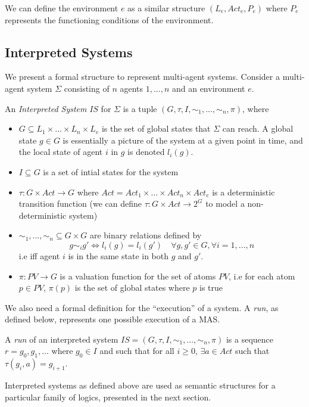\documentclass[11pt]{report}
\newenvironment{definition}[1][Definition]{\begin{trivlist}
\item[\hskip \labelsep {\bfseries #1}]}{\end{trivlist}}
\begin{document}
We can define the environment $e$ as a similar structure $(L_e, Act_e, P_e)$ where $P_e$ represents the functioning conditions of the environment. 

\subsection{Interpreted Systems}
\label{IS}
We present a formal structure to represent multi-agent systems. Consider a multi-agent system $\Sigma$ consisting of $n$ agents $1, ..., n$ and an environment $e$.
\begin{definition}
An \textit{Interpreted System} $IS$ for $\Sigma$ is a tuple $(G, \tau, I, \sim_1, ..., \sim_n, \pi)$, where
\begin{itemize}
\item $G \subseteq L_1 \times ... \times L_n \times L_e$ is the set of global states that $\Sigma$ can reach. A global state $g \in G$ is essentially a picture of the system at a given point in time, and the local state of agent $i$ in $g$ is denoted $l_i(g)$.
\item $I \subseteq G$ is a set of intial states for the system
\item $\tau : G \times Act \rightarrow G $ where $Act = Act_1 \times ... \times Act_n \times Act_e$ is a deterministic transition function (we can define $\tau : G \times Act \rightarrow 2^G$ to model a non-deterministic system)
\item $\sim_1, ..., \sim_n \subseteq G \times G$  are binary relations defined by $$g \sim_i g' \Leftrightarrow l_i(g) = l_i(g') \quad \forall g, g' \in G, \forall i = 1, ..., n$$
i.e iff agent $i$ is in the same state in both $g$ and $g'$. 
\item $\pi : PV \rightarrow G$ is a valuation function for the set of atoms $PV$, i.e for each atom $p \in PV$, $\pi(p)$ is the set of global states where $p$ is true
\end{itemize}
\end{definition}
We also need a formal definition for the ``execution'' of a system. A \emph{run}, as defined below, represents one possible execution of a MAS. 
\begin{definition} 
A \emph{run} of an interpreted system $IS = (G, \tau, I, \sim_1, ..., \sim_n, \pi)$ is a sequence $r = g_0, g_1, ...$ where $g_0 \in I$ and such that for all $i \geq 0$, $\exists a \in Act$ such that $\tau(g_i, a) = g_{i+1}$.
\end{definition}

Interpreted systems as defined above are used as semantic structures for a particular family of logics, presented in the next section.
\end{document}
